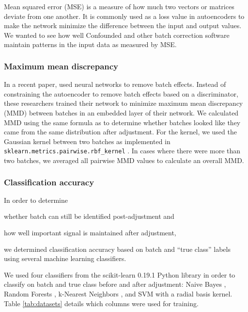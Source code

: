\documentclass[notitlepage]{article}
\begin{document}
Mean squared error (MSE) is a measure of how much two vectors or matrices deviate from one another.
It is commonly used as a loss value in autoencoders to make the network minimize the difference between the input and output values.
We wanted to see how well Confounded and other batch correction software maintain patterns in the input data as measured by MSE.

\subsubsection{Maximum mean discrepancy} \label{section:mmd}

In a recent paper, \citet{shaham_removal_2017} used neural networks to remove batch effects.
Instead of constraining the autoencoder to remove batch effects based on a discriminator, these researchers trained their network to minimize maximum mean discrepancy (MMD) between batches in an embedded layer of their network.
We calculated MMD using the same formula as \citeauthor{shaham_removal_2017} to determine whether batches looked like they came from the same distribution after adjustment.
For the kernel, we used the Gaussian kernel between two batches as implemented in \texttt{sklearn.metrics.pairwise.rbf\_kernel} \cite{pedregosa_scikit-learn_2011}.
In cases where there were more than two batches, we averaged all pairwise MMD values to calculate an overall MMD.

\subsubsection{Classification accuracy}

In order to determine \begin{enumerate*}[(a)]
	\item whether batch can still be identified post-adjustment and
	\item how well important signal is maintained after adjustment,
\end{enumerate*}
we determined classification accuracy based on batch and ``true class'' labels using several machine learning classifiers.

We used four classifiers from the scikit-learn 0.19.1 Python library \cite{pedregosa_scikit-learn_2011} in order to classify on batch and true class before and after adjustment: Naive Bayes \citep{maron_automatic_1961}, Random Forests \citep{tin_kam_ho_random_1995}, k-Nearest Neighbors \citep{fix_discriminatory_1951}, and SVM \citep{cortes_support-vector_1995} with a radial basis kernel.
Table \ref{tab:datasets} details which columns were used for training.
\end{document}

